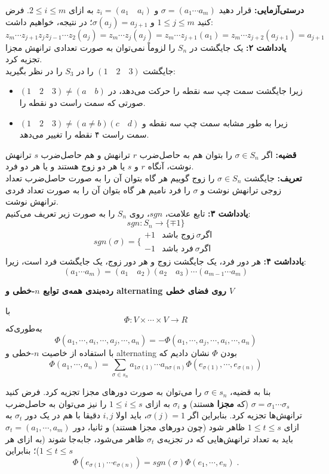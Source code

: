 	\textbf{درستی‌آزمایی:}
	قرار دهید $\sigma = (a_1\cdots a_m)$ و $z_i= (a_1 \quad a_i)$ به ازای $2\leq i \leq m$. فرض کنید $1\leq j \leq m$ و $\sigma(a_j) = a_{j+1}$؛ در نتیجه، خواهیم داشت:
	$$z_m\cdots z_{j+1} z_j z_{j-1}\cdots z_2(a_j) = z_m\cdots z_j(a_j) = z_m \cdots z_{j+1}(a_1) = z_m\cdots z_{j+2}(a_{j+1}) = a_{j+1}$$
	\textbf{یادداشت ۲:}
	یک جایگشت در $S_n$ را لزوماً نمی‌توان به صورت تعدادی ترانهش مجزا تجزیه کرد.\\
	جایگشت $(1 \quad 2 \quad 3)$ را در $S_3$ را در نظر بگیرید:
	\begin{itemize}
		\item $(1\quad 2 \quad 3) \neq (a \quad b)$ زیرا جایگشت سمت چپ سه نقطه را حرکت می‌دهد، در صورتی که سمت راست دو نقطه را.
		\item $(1\quad 2\quad 3) \neq (a \neq b)( c \quad d)$ زیرا به طور مشابه سمت چپ سه نقطه و سمت راست ۴ نقطه را تغییر می‌دهد.
	\end{itemize}
	\textbf{قضیه:}
	اگر $\sigma \in S_n$ را بتوان هم به حاصل‌ضرب $r$ ترانهش و هم حاصل‌ضرب $s$ ترانهش نوشت، آنگاه $r$ و $s$ یا هر دو زوج هستند و یا هر دو فرد.\\
	\textbf{تعریف:}
	جایگشت $\sigma \in S_n$ را زوج 
	گوییم هر گاه بتوان آن را به صورت حاصل‌ضرب تعداد زوجی ترانهش نوشت و $\sigma$ را فرد نامیم هر گاه بتوان آن را به صورت تعداد فردی ترانهش نوشت.\\
	\textbf{یادداشت ۳:}
	تابع علامت، $sgn$، روی $S_n$ را به صورت زیر تعریف می‌کنیم:
	$$sgn: S_n \rightarrow \{\mp1\}$$
	$$sgn(\sigma) = \bigg\{ \begin{array}{cc}
	+1  & \text{زوج باشد} \: \sigma \text{اگر }\\
	-1  & \text{فرد باشد} \: \sigma \text{اگر}
	\end{array}$$
	\textbf{یادداشت ۴:}
	هر دور فرد، یک جایگشت زوج و هر دور زوج، یک جایگشت فرد است، زیرا:
	$$(a_1\cdots a_m) = (a_1\quad a_2)(a_2 \quad a_3) \cdots (a_{m-1} \cdots a_m)$$
	
	
	
	\textbf{رده‌بندی همه‌ی توابع $n$-خطی و alternating روی فضای خطی $V$}
	
	با
	$$\Phi: V \times \cdots \times V \to R $$
	به‌طوری‌که
	$$
	\Phi(a_1,\cdots,a_i,\cdots,a_j,\cdots,a_n) = -\Phi(a_1,\cdots,a_j,\cdots,a_i,\cdots,a_n)
	$$
	با استفاده از خاصیت $n$-خطی و alternating بودن $\Phi$ نشان دادیم که
	$$
	\Phi(a_1,\cdots,a_n) = \sum_{\sigma \in s_n} a_{1\sigma(1)} \cdots a_{n\sigma(n)}
	\Phi(e_{\sigma(1)},\cdots,e_{\sigma(n)})
	$$
	
	بنا به قضیه، $\sigma \in s_n$ را می‌توان به صورت دورهای مجزا تجزیه کرد. فرض کنید $\sigma = \sigma_1 \cdots \sigma_s$ (که \textbf{مجزا} هستند) و $\sigma_i$ به ازای $1\leq i \leq s$ را نیز می‌توان به حاصل‌ضرب ترانهش‌ها تجزیه کرد. بنابراین اگر $\sigma(j)=1$، باید اولا $i,j$ دقیقا با هم در یک دور $\sigma_t$ به ازای $1\leq t \leq s$ ظاهر شود (چون دورهای مجزا هستند) و ثانیا، دور $\sigma_t = (a_1,\cdots,a_m)$ باید به تعداد ترانهش‌هایی که در تجزیه‌ی $\sigma_t$ ظاهر می‌شود، جابه‌جا شوند (به ازای هر $1\leq t \leq s$)؛ بنابراین
	$$
	\Phi(e_{\sigma(1)} \cdots e_{\sigma(n)}) = sgn(\sigma) \Phi(e_1,\cdots,e_n)
	\; .$$
	
